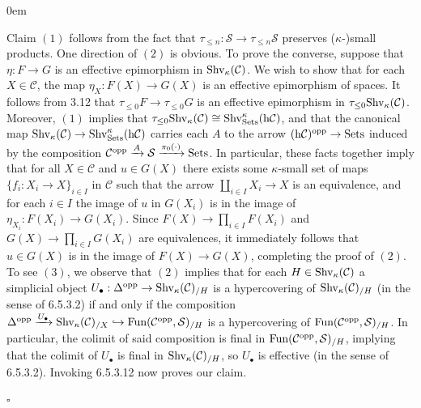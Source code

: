 \documentclass[10pt]{article}
\newcommand{\mS}{\mathcal S}
\newcommand{\C}{\mathcal C}
\renewcommand{\qed}{\hfill$\square$}
\renewenvironment{proof}{\begin{addmargin}[1em]{0em}\begin{newproof}}{\end{newproof}\end{addmargin}\qed}
\theoremstyle{witharg}
\theoremstyle{witharg}
\theoremstyle{witharg2}
\begin{document}
\begin{proof}

Claim $(1)$ follows from the fact that $\tau_{\leq n}:\mS\rightarrow \tau_{\leq n}\mS$ preserves ($\kappa$-)small products. One direction of $(2)$ is obvious. To prove the converse, suppose that $\eta:F\rightarrow G$ is an effective epimorphism in $\textnormal{Shv}_\kappa(\C)$. We wish to show that for each $X\in \C$, the map $\eta_X:F(X)\rightarrow G(X)$ is an effective epimorphism of spaces. It follows from  3.12 that $\tau_{\leq 0}F\rightarrow \tau_{\leq 0}G$ is an effective epimorphism in $\tau_{\leq 0}\textnormal{Shv}_\kappa(\C)$. Moreover, $(1)$ implies that $\tau_{\leq 0}\textnormal{Shv}_\kappa(\C)\cong \textnormal{Shv}^\kappa_{\textnormal{Sets}}(\textnormal{h}\C)$, and that the canonical map $\textnormal{Shv}_\kappa(\C)\rightarrow \textnormal{Shv}^\kappa_{\textnormal{Sets}}(\textnormal{h}\C)$ carries each $A$ to the arrow $(\textnormal{h}\C)^\textnormal{opp}\rightarrow \textnormal{Sets}$ induced by the composition $\C^{\textnormal{opp}}\xrightarrow{A}\mS\xrightarrow{\pi_0(\cdot)}\textnormal{Sets}$. In particular, these facts together imply that for all $X\in \C$ and $u\in G(X)$ there exists some $\kappa$-small set of maps $\{f_i:X_i\rightarrow X\}_{i\in I}$ in $\C$ such that the arrow $\coprod_{i\in I}X_i\rightarrow X$ is an equivalence, and for each $i\in I$ the image of $u$ in $G(X_i)$ is in the image of $\eta_{X_i}:F(X_i)\rightarrow G(X_i)$. Since $F(X)\rightarrow \prod_{i\in I}F(X_i)$ and $G(X)\rightarrow \prod_{i\in I}G(X_i)$ are equivalences, it immediately follows that $u\in G(X)$ is in the image of $F(X)\rightarrow G(X)$, completing the proof of $(2)$. To see $(3)$, we observe that $(2)$ implies that for each $H\in \textnormal{Shv}_\kappa(\C)$ a simplicial object $U_\bullet:\Delta^{\textnormal{opp}}\rightarrow \textnormal{Shv}_\kappa(\C)_{/H}$ is a hypercovering of $\textnormal{Shv}_\kappa(\C)_{/H}$ (in the sense of  6.5.3.2) if and only if the composition $\Delta^{\textnormal{opp}}\xrightarrow{U_\bullet}\textnormal{Shv}_\kappa(\C)_{/X}\hookrightarrow \textnormal{Fun}(\C^{\textnormal{opp}},\mS)_{/H}$ is a hypercovering of $\textnormal{Fun}(\C^{\textnormal{opp}},\mS)_{/H}$. In particular, the colimit of said composition is final in $\textnormal{Fun}(\C^{\textnormal{opp}},\mS)_{/H}$, implying that the colimit of $U_\bullet$ is final in $\textnormal{Shv}_\kappa(\C)_{/H}$, so $U_\bullet$ is effective (in the sense of  6.5.3.2). Invoking  6.5.3.12 now proves our claim. 
    
\end{proof}
\end{document}
